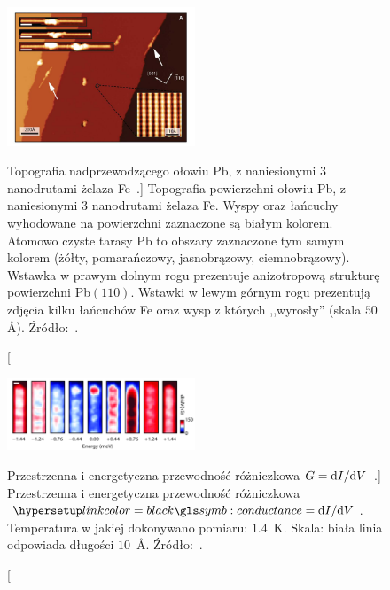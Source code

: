 \begin{figure}
    \centering
    \includegraphics[width=0.5\textwidth]{04-Includes/Figures/Observe/observe2.pdf}
    \caption
    [Topografia nadprzewodzącego ołowiu Pb, z naniesionymi 3 nanodrutami żelaza Fe~\cite{nadj-perge.drozdov.2014}.]
    {Topografia powierzchni ołowiu Pb, z naniesionymi 3 nanodrutami żelaza Fe. 
    Wyspy oraz łańcuchy wyhodowane na powierzchni zaznaczone są białym kolorem.
    Atomowo czyste tarasy Pb to obszary zaznaczone tym samym kolorem (żółty, pomarańczowy, jasnobrązowy, ciemnobrązowy).
    Wstawka w prawym dolnym rogu prezentuje anizotropową strukturę powierzchni Pb$(110)$.
    Wstawki w lewym górnym rogu prezentują zdjęcia kilku łańcuchów Fe oraz wysp z których ,,wyrosły'' (skala $50$ \AA).
    Źródło:~\cite{nadj-perge.drozdov.2014}.
    }
    \label{fig:observe2}
\end{figure}
\begin{figure}


    \centering
    \includegraphics[width=0.5\textwidth]{04-Includes/Figures/Observe/observe3a.png}
    \caption
    [Przestrzenna i energetyczna przewodność różniczkowa $G=\text dI/\text dV$~\cite{nadj-perge.drozdov.2014}.]
    {Przestrzenna i energetyczna przewodność różniczkowa $\conductance=\text dI/\text dV$. Temperatura w jakiej dokonywano pomiaru: $1.4$~K.
    Skala: biała linia odpowiada długości $10$~\AA.
    Źródło:~\cite{nadj-perge.drozdov.2014}.
    }
    \label{fig:observe3}
\end{figure}

